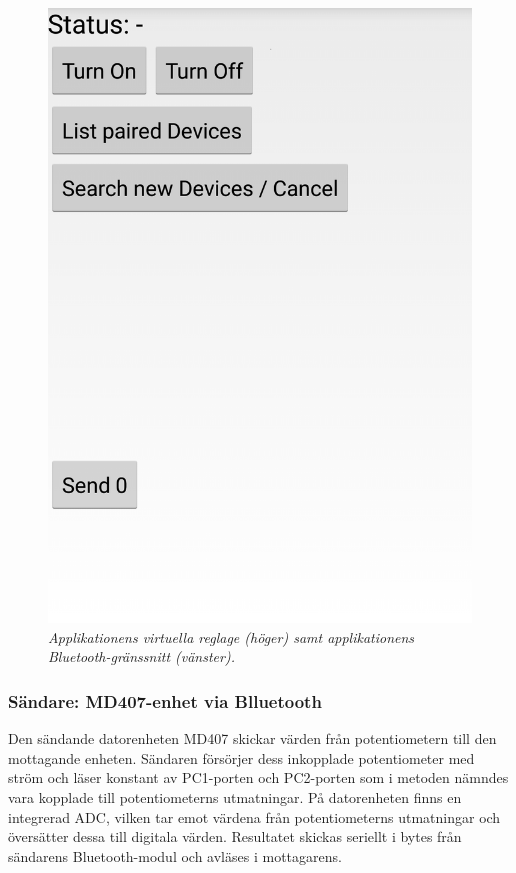 \documentclass[a4paper]{article}
\begin{document}
\begin{figure}[H]
\includegraphics[scale=0.2]{applikation2.png}
\centering
\caption{\it Applikationens virtuella reglage (höger) samt applikationens Bluetooth-gränssnitt (vänster).}
\end{figure} 

\subsubsection{Sändare: MD407-enhet via Blluetooth}
Den sändande datorenheten MD407 skickar värden från potentiometern till den mottagande enheten. Sändaren försörjer dess inkopplade potentiometer med ström och läser konstant av PC1-porten och PC2-porten som i metoden nämndes vara kopplade till potentiometerns utmatningar. På datorenheten finns en integrerad ADC, vilken tar emot värdena från potentiometerns utmatningar och översätter dessa till digitala värden. Resultatet skickas seriellt i bytes från sändarens Bluetooth-modul och avläses i mottagarens.
\end{document}
